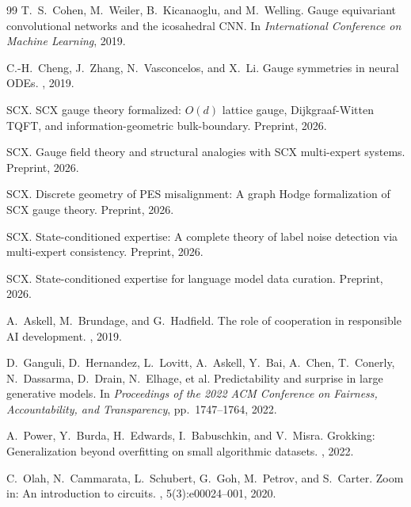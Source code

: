 \documentclass[12pt,a4paper]{article}
\theoremstyle{remark}
\begin{document}
\begin{thebibliography}{99}
T.\ S.\ Cohen, M.\ Weiler, B.\ Kicanaoglu, and M.\ Welling.
\newblock Gauge equivariant convolutional networks and the icosahedral CNN.
\newblock In {\em International Conference on Machine Learning}, 2019.

C.-H.\ Cheng, J.\ Zhang, N.\ Vasconcelos, and X.\ Li.
\newblock Gauge symmetries in neural ODEs.
, 2019.

SCX.
\newblock SCX gauge theory formalized: $O(d)$ lattice gauge, Dijkgraaf-Witten TQFT, and information-geometric bulk-boundary.
\newblock Preprint, 2026.

SCX.
\newblock Gauge field theory and structural analogies with SCX multi-expert systems.
\newblock Preprint, 2026.

SCX.
\newblock Discrete geometry of PES misalignment: A graph Hodge formalization of SCX gauge theory.
\newblock Preprint, 2026.

SCX.
\newblock State-conditioned expertise: A complete theory of label noise detection via multi-expert consistency.
\newblock Preprint, 2026.

SCX.
\newblock State-conditioned expertise for language model data curation.
\newblock Preprint, 2026.

A.\ Askell, M.\ Brundage, and G.\ Hadfield.
\newblock The role of cooperation in responsible AI development.
, 2019.

D.\ Ganguli, D.\ Hernandez, L.\ Lovitt, A.\ Askell, Y.\ Bai, A.\ Chen, T.\ Conerly, N.\ Dassarma, D.\ Drain, N.\ Elhage, et al.
\newblock Predictability and surprise in large generative models.
\newblock In {\em Proceedings of the 2022 ACM Conference on Fairness, Accountability, and Transparency}, pp.\ 1747--1764, 2022.

A.\ Power, Y.\ Burda, H.\ Edwards, I.\ Babuschkin, and V.\ Misra.
\newblock Grokking: Generalization beyond overfitting on small algorithmic datasets.
, 2022.

C.\ Olah, N.\ Cammarata, L.\ Schubert, G.\ Goh, M.\ Petrov, and S.\ Carter.
\newblock Zoom in: An introduction to circuits.
, 5(3):e00024--001, 2020.


\end{thebibliography}
\end{document}

